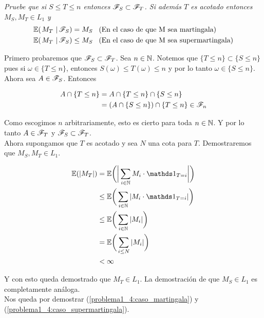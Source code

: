 \emph{
	Pruebe que si $S\leq T\leq n$ entonces $\mathscr{F}_S\subset\mathscr{F}_T$. Si además $T$ es acotado entonces $M_S,M_T \in L_1$ y 
	\begin{align}
		\espc{M_T}{\F_S} = M_S &\mbox{\;\;\;(En el caso de que M sea martingala)} \label{problema1_4:caso_martingala}\\
		\espc{M_T}{\F_S}\leq M_S &\mbox{\;\;\;(En el caso de que M sea supermartingala)} \label{problema1_4:caso_supermartingala}
	\end{align}	
}

	Primero probaremos que $\mathscr{F}_S \subset \mathscr{F}_T$. Sea $n \in \mathbb{N}$. Notemos que $\{ T \leq n \} \subset \{ S \leq n \}$ pues
	si $\omega \in \{ T \leq n \}$, entonces $S(\omega) \leq T(\omega) \leq n $ y por lo tanto $\omega \in \{ S \leq n \}$.\\

	Ahora sea $A \in \mathscr{F}_S$. Entonces

	\begin{align}
		A \cap \{ T \leq n \} 	&=		A  \cap \{ T \leq n \} \cap \{ S \leq n \} \\
								&=		(A  \cap \{ S \leq n \}) \cap \{ T \leq n \} \in \mathscr{F}_n
	\end{align}

	Como escogimos $n$ arbitrariamente, esto es cierto para toda $n \in \mathbb{N}$. Y por lo tanto $A \in \mathscr{F}_T$ y $\mathscr{F}_S \subset \mathscr{F}_T$.\\

	Ahora supongamos que $T$ es acotado y sea $N$ una cota para $T$. Demostraremos que $M_S,M_T \in L_1$.
	
	\begin{align}
		\E(|M_T|) 	&=		\E\bigg(	\bigg| \sum_{i \in \N} M_i \cdot \indic_{T = i} \bigg|	\bigg) \\ 
					&\leq	\E\bigg(	\sum_{i \in \N} |M_i \cdot \indic_{T = i} |				\bigg) \\
					&\leq	\E\bigg(	\sum_{i \in \N} |M_i|									\bigg) \\
					&=		\E\bigg(	\sum_{i \leq N} |M_i|									\bigg) \\
					&< 		\infty
	\end{align}
	
	Y con esto queda demostrado que $M_T \in L_1$. La demostración de que $M_S \in L_1$ es completamente análoga.\\
	
	Nos queda por demostrar (\ref{problema1_4:caso_martingala}) y (\ref{problema1_4:caso_supermartingala}).\\
	
